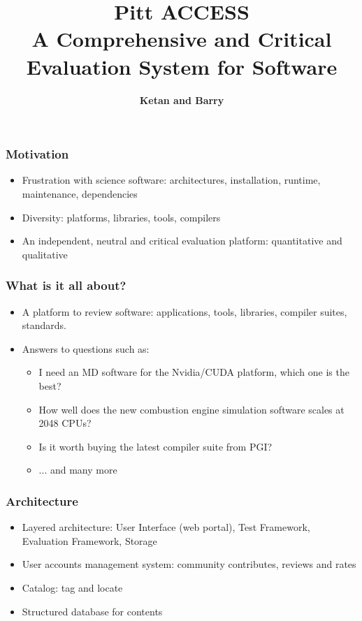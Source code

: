 \documentclass[hyperref={pdfpagelabels=false},12pt]{beamer}
\title[Pitt Access]{{\large Pitt ACCESS\\ A Comprehensive and Critical Evaluation System for Software}}
\author[Pitt-Access]{{\scriptsize \textbf{Ketan and Barry}}}
\date{}
\begin{document}
\begin{frame}[plain]
\titlepage
\end{frame}

\begin{frame}
\frametitle{Motivation}
\begin{itemize}
\itemsep1em
\item 
Frustration with science software: architectures, installation, runtime, maintenance, dependencies
\item 
Diversity: platforms, libraries, tools, compilers
\item 
An independent, neutral and critical evaluation platform: quantitative and qualitative
\end{itemize}
\end{frame}

\begin{frame}
\frametitle{What is it all about?}
\begin{itemize}
\itemsep1em
\item 
A platform to review software: applications, tools, libraries, compiler suites, standards.
\item 
Answers to questions such as:
\begin{itemize}
\item 
I need an MD software for the Nvidia/CUDA platform, which one is the best?
\item 
How well does the new combustion engine simulation software scales at 2048 CPUs?
\item 
Is it worth buying the latest compiler suite from PGI?
\item 
... and many more
\end{itemize}
\end{itemize}

\end{frame}

\begin{frame}
\frametitle{Architecture}
\begin{itemize}
\itemsep1em
\item 
Layered architecture: User Interface (web portal), Test Framework, Evaluation Framework, Storage
\item
User accounts management system: community contributes, reviews and rates
\item
Catalog: tag and locate
\item
Structured database for contents
\end{itemize}
\end{frame}
\end{document}
